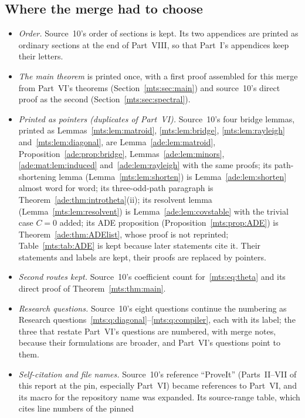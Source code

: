 \documentclass[11pt]{article}
\numberwithin{equation}{section}
\theoremstyle{definition}
\begin{document}
\subsection{Where the merge had to choose}
\label{mts:sec:merge}
\begin{itemize}[leftmargin=1.4em]
\item \emph{Order.} Source~10's order of sections is kept. Its two
appendices are printed as ordinary sections at the end of Part~VIII, so
that Part~I's appendices keep their letters.
\item \emph{The main theorem} is printed once, with a first proof assembled
for this merge from Part~VI's theorems (Section~\ref{mts:sec:main}) and
source~10's direct proof as the second
(Section~\ref{mts:sec:spectral}).
\item \emph{Printed as pointers (duplicates of Part~VI).} Source~10's
four bridge lemmas, printed as
Lemmas~\ref{mts:lem:matroid}, \ref{mts:lem:bridge}, \ref{mts:lem:rayleigh}
and~\ref{mts:lem:diagonal}, are Lemma~\ref{ade:lem:matroid},
Proposition~\ref{ade:prop:bridge}, Lemmas~\ref{ade:lem:minors},
\ref{ade:mat:lem:induced} and~\ref{ade:lem:rayleigh} with the same proofs;
its path-shortening lemma (Lemma~\ref{mts:lem:shorten}) is
Lemma~\ref{ade:lem:shorten} almost word for word; its three-odd-path
paragraph is Theorem~\ref{ade:thm:introtheta}(ii); its resolvent lemma
(Lemma~\ref{mts:lem:resolvent}) is Lemma~\ref{ade:lem:covstable} with the
trivial case $C=0$ added; its ADE proposition
(Proposition~\ref{mts:prop:ADE}) is Theorem~\ref{ade:thm:ADElist}, whose
proof is not reprinted; Table~\ref{mts:tab:ADE} is kept because later
statements cite it. Their statements and labels are kept, their proofs are
replaced by pointers.
\item \emph{Second routes kept.} Source~10's coefficient count
for~\eqref{mts:eq:theta} and its direct proof of
Theorem~\ref{mts:thm:main}.
\item \emph{Research questions.} Source~10's eight questions continue the
numbering as Research questions~\ref{mts:q:diagonal}--\ref{mts:q:compiler},
each with its label; the three that restate Part~VI's questions are
numbered, with merge notes, because their formulations are broader, and
Part~VI's questions point to them.
\item \emph{Self-citation and file names.} Source~10's reference
``ProveIt'' (Parts~II--VII of this report at the pin, especially Part~VI)
became references to Part~VI, and its macro for the repository name was
expanded. Its source-range table, which cites line numbers of the pinned

\end{itemize}
\end{document}
